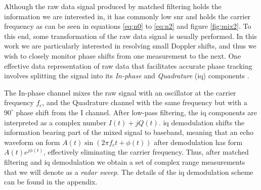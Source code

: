 Although the raw data signal produced by matched filtering holds the information we are interested in, it has commonly low \gls{snr} \citep{richards_2014} and holds the carrier frequency as can be seen in equations \eqref{eq:n0} to \eqref{eq:n2} and figure \ref{fig:mix2}. To this end, some transformation of the raw data signal is usually performed. In this work we are particularly interested in resolving small Doppler shifts, and thus we wish to closely monitor phase shifts from one measurement to the next. One effective data representation of raw data that facilitates accurate phase tracking involves splitting the signal into its \emph{In-phase} and \emph{Quadrature} (\gls{iq}) components \citep{lien_gillian_karagozler_amihood_schwesig_olson_raja_poupyrev_2016}. 

The In-phase channel mixes the raw signal with an oscillator at the carrier frequency $f_c$, and the Quadrature channel with the same frequency but with a $90^\circ$ phase shift from the I channel. After low-pass filtering, the \gls{iq} components are interpreted as a complex number $I(t) + jQ(t)$. \gls{iq} demodulation shifts the information bearing part of the mixed signal to baseband, meaning that an echo waveform on form $A(t)\sin(2\pi f_c t + \phi(t))$ after demodulation has form $A(t)e^{j\phi(t)}$, effectively eliminating the carrier frequency. Thus, after matched filtering and \gls{iq} demodulation we obtain a set of complex range measurements that we will denote as a \emph{radar sweep}. The details of the \gls{iq} demodulation scheme can be found in the appendix. 





